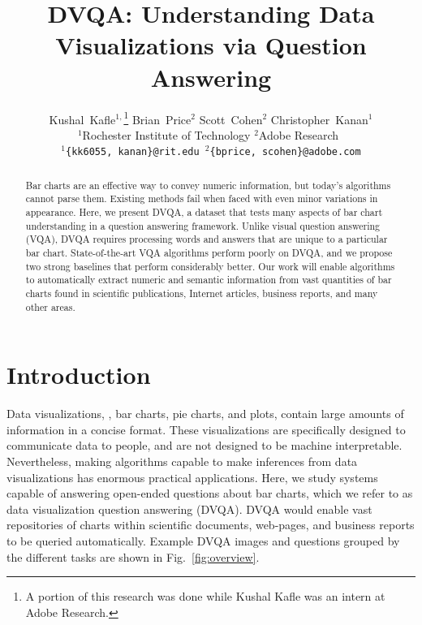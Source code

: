 \documentclass[10pt,twocolumn,letterpaper]{article}
\begin{document}
\title{DVQA: Understanding Data Visualizations via Question Answering}

\author{Kushal~Kafle$^{1,}$\thanks{A portion of this research was done while Kushal Kafle was an intern at Adobe Research.} \qquad Brian~Price$^2$
  \qquad Scott~Cohen$^2$ \qquad Christopher~Kanan$^1$\\
  \hfill$^1$Rochester Institute of Technology\hfill
  $^2$Adobe Research\hfill\mbox{ }\\
{\tt\small $^1$\{kk6055, kanan\}@rit.edu \qquad  $^2$\{bprice, scohen\}@adobe.com}}

\maketitle

\begin{abstract}
Bar charts are an effective way to convey numeric information, but today's algorithms cannot parse them. Existing methods fail when faced with even minor variations in appearance. Here, we present DVQA, a dataset that tests many aspects of bar chart understanding in a question answering framework. Unlike visual question answering (VQA), DVQA requires processing words and answers that are unique to a particular bar chart. State-of-the-art VQA algorithms perform poorly on DVQA, and we propose two strong baselines that perform considerably better. Our work will enable algorithms to automatically extract numeric and semantic information from vast quantities of bar charts found in scientific publications, Internet articles, business reports, and many other areas. 
\end{abstract}

\section{Introduction}\label{sec:intro}

Data visualizations, \eg, bar charts, pie charts, and plots, contain large amounts of information in a concise format. These visualizations are specifically designed to communicate data to people, and are not designed to be machine interpretable. Nevertheless, making algorithms capable to make inferences from data visualizations has enormous practical applications. Here, we study systems capable of answering open-ended questions about bar charts, which we refer to as data visualization question answering (DVQA). DVQA would enable vast repositories of charts within scientific documents, web-pages, and business reports to be queried automatically. Example DVQA images and questions grouped by the different tasks are shown in Fig.~\ref{fig:overview}.
\end{document}

